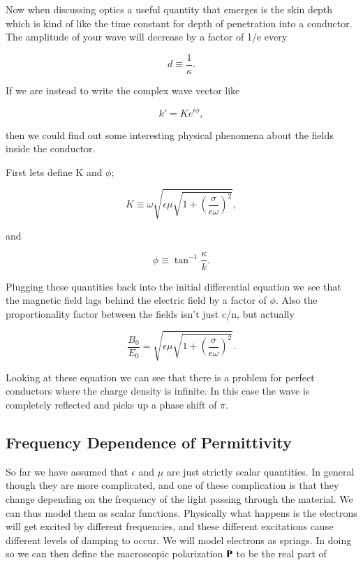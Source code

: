 \documentclass[preprint, review,12pt]{elsarticle}
\def\b{\textbf}
\def\={\equiv}
\def\9{\left(}
\def\0{\right)}
\begin{document}
Now when discussing optics a useful quantity that emerges is the skin depth which is kind of like the time constant for depth of penetration into a conductor. The amplitude of your wave will decrease by a factor of 1/e every

\begin{equation}
    d \= \frac{1}{\kappa}.
\end{equation}

If we are instead to write the complex wave vector like

\begin{equation}
    k' = Ke^{i \phi},
\end{equation}

then we could find out some interesting physical phenomena about the fields inside the conductor. 

First lets define K and $\phi$;

\begin{equation}
    K \= \omega \sqrt{\epsilon \mu \sqrt{1 + \9 \frac{\sigma}{\epsilon\omega} \0^2}},
\end{equation}

and 

\begin{equation}
    \phi \= \tan^{-1} \frac{\kappa}{k}.
\end{equation}

Plugging these quantities back into the initial differential equation we see that the magnetic field lags behind the electric field by a factor of $\phi.$ Also the proportionality factor between the fields isn't just c/n, but actually

\begin{equation}
    \frac{B_0}{E_0} = \sqrt{\epsilon \mu \sqrt{1 + \9 \frac{\sigma}{\epsilon\omega} \0^2}}.
\end{equation}

Looking at these equation we can see that there is a problem for perfect conductors where the charge density is infinite. In this case the wave is completely reflected and picks up a phase shift of $\pi$.

\subsection{Frequency Dependence of Permittivity}

So far we have assumed that $\epsilon$ and $\mu$ are just strictly scalar quantities. In general though they are more complicated, and one of these complication is that they change depending on the frequency of the light passing through the material. We can thus model them as scalar functions. Physically what happens is the electrons will get excited by different frequencies, and these different excitations cause different levels of damping to occur. We will model electrons as springs. In doing so we can then define the macroscopic polarization $\b P$ to be the real part of
\end{document}
